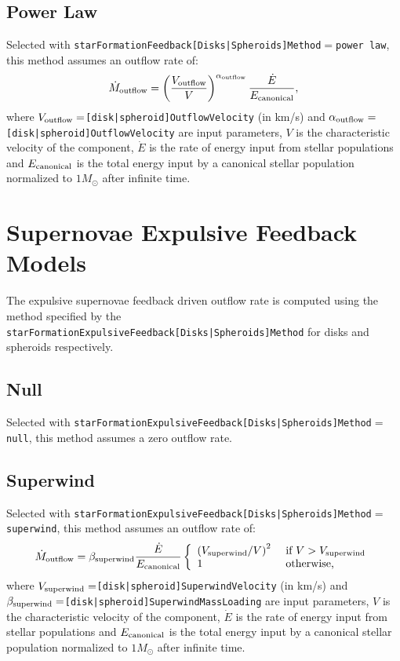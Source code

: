 \subsection{Power Law}

Selected with {\tt starFormationFeedback[Disks|Spheroids]Method}$=${\tt power law}, this method assumes an outflow rate of:
\begin{equation}
 \dot{M}_{\rm outflow} = \left({V_{\rm outflow} \over V}\right)^{\alpha_{\rm outflow}} {\dot{E} \over E_{\rm canonical}},
\end{equation}
where $V_{\rm outflow}=${\tt [disk|spheroid]OutflowVelocity} (in km/s) and $\alpha_{\rm outflow}=${\tt [disk|spheroid]OutflowVelocity} are input parameters, $V$ is the characteristic velocity of the component, $\dot{E}$ is the rate of energy input from stellar populations and $E_{\rm canonical}$ is the total energy input by a canonical stellar population normalized to $1 M_\odot$ after infinite time.

\section{Supernovae Expulsive Feedback Models}\label{sec:sneExpulsiveFeedback}

The expulsive supernovae feedback driven outflow rate is computed using the method specified by the {\tt starFormationExpulsiveFeedback[Disks|Spheroids]Method} for disks and spheroids respectively.

\subsection{Null}

Selected with {\tt starFormationExpulsiveFeedback[Disks|Spheroids]Method}$=${\tt null}, this method assumes a zero outflow rate.

\subsection{Superwind}

Selected with {\tt starFormationExpulsiveFeedback[Disks|Spheroids]Method}$=${\tt superwind}, this method assumes an outflow rate of:
\begin{equation}
 \dot{M}_{\rm outflow} =  \beta_{\rm superwind} {\dot{E} \over E_{\rm canonical}} \left\{ \begin{array}{ll} \left( V_{\rm superwind}/V\right)^2 & \hbox{ if } V > V_{\rm superwind} \\ 1 & \hbox{ otherwise,} \end{array} \right.
\end{equation}
where $V_{\rm superwind}=${\tt [disk|spheroid]SuperwindVelocity} (in km/s) and $\beta_{\rm superwind}=${\tt [disk|spheroid]SuperwindMassLoading} are input parameters, $V$ is the characteristic velocity of the component, $\dot{E}$ is the rate of energy input from stellar populations and $E_{\rm canonical}$ is the total energy input by a canonical stellar population normalized to $1 M_\odot$ after infinite time.


